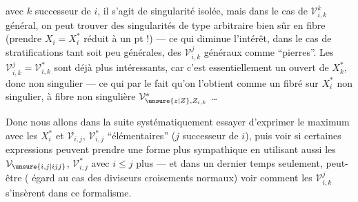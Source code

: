 avec $k$ successeur de $i$, il s'agit de singularité isolée, mais dans le cas de $\mathcal{V}_{i,k}^k$ général, on peut trouver des singularités de type arbitraire bien sûr en fibre (prendre $X_i=X_i^*$ réduit à un pt !) — ce qui diminue l'intérêt, dans le cas de stratifications tant soit peu générales, des $\mathcal{V}_{i,k}^j$ généraux comme ``pierres''. Les $\mathcal{V}_{i,k}^{j}=\mathcal{V}_{i,k}^*$ sont déjà plus intéressants, car  c'est essentiellement un  ouvert de $X_k^*$, donc non singulier — ce qui  par le fait qu'on l'obtient comme un fibré sur $X_i^*$ non singulier, à fibre non singulière $\mathcal{V}_{\unsure{z|Z},Z_{i,k}}^*$ \ldots

Donc nous allons dans la suite systématiquement essayer d'exprimer le maximum avec les $X_i^*$ et  $\mathcal{V}_{i,j}$, $\mathcal{V}_{i,j}^*$ ``élémentaires'' ($j$ successeur de $i$), puis voir si certaines expressions peuvent prendre une forme plus sympathique en utilisant aussi  les $\mathcal{V}_{\unsure{i,j|ijj}}$, $\mathcal{V}_{i,j}^*$ avec $i\leq j$  plus — et dans un dernier temps seulement, peut-être ( égard au cas des diviseurs  croisements normaux) voir comment les $\mathcal{V}_{i,k}^j$ s'insèrent dans ce formalisme.
